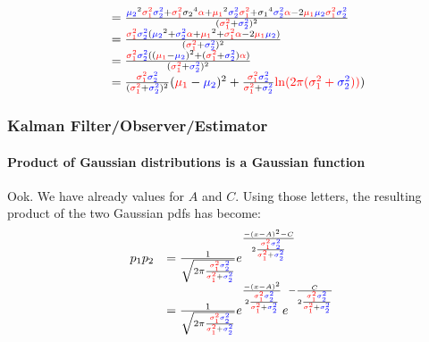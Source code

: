 \begin{frame}[plain]
\begin{equation*}
\begin{array}{rlllllll}
&=\frac  {      {\mutwo}^2 \varone \vartwo + \varone {\stwo}^4 {\color{red}\alpha} + {\muone}^2 \vartwo \varone + {\sone}^4 \vartwo {\color{red}\alpha} - 2{\muone}{\mutwo} \varone \vartwo  }  {      (\varone + \vartwo)^2  }\\
&=\frac  {      \varone \vartwo ( {\mutwo}^2 + \vartwo {\color{red}\alpha} + {\muone}^2 + \varone {\color{red}\alpha} - 2{\muone}{\mutwo} )  }   {      (\varone + \vartwo)^2  }\\
&=\frac  {      \varone \vartwo ( ( {\muone} - {\mutwo} )^2 + (\varone + \vartwo) {\color{red}\alpha} )  }   {      (\varone + \vartwo)^2  }\\
&=\frac { \varone \vartwo }{ (\varone + \vartwo)^2 } ({\muone} - {\mutwo} )^2+\frac { \varone \vartwo }{ \varone + \vartwo } \myalpha )\\
\end{array}
\end{equation*}

\end{frame}




\begin{frame}[plain]\pw\Large
\frametitle{Kalman Filter/Observer/Estimator}
\framesubtitle{Product of Gaussian distributions is a Gaussian function}


\scriptsize
Ook. We have already values for $A$ and $C$. Using those letters, the resulting product of the two Gaussian pdfs has become:
\begin{equation*}
\begin{array}{rlllllll}
p_1p_2&=    \frac{1}{\sqrt{2 \pi \frac { \varone \vartwo }{\varone + \vartwo} }}    e^{ \frac{-(x-A)^2-C}{2 \frac{\varone \vartwo}{\varone + \vartwo}} } \\
&=    \frac{1}{\sqrt{2 \pi \frac { \varone \vartwo }{\varone + \vartwo} }}    e^{ \frac{-(x-A)^2}{2 \frac{\varone \vartwo}{\varone + \vartwo}} }   e^{- \frac {C}{2 \frac{\varone \vartwo}{\varone + \vartwo}} }
\end{array}
\end{equation*}

\end{frame}




